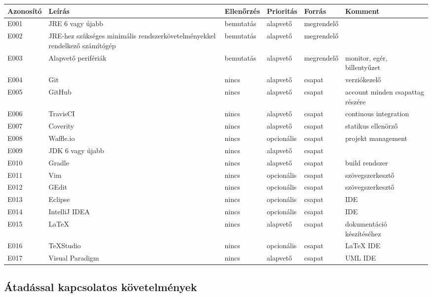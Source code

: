 \begin{tabularx}{\linewidth}{| l | X | l | l | l | X |}
\hline
\textbf{Azonosító}   & \textbf{Leírás} & \textbf{Ellenőrzés} & \textbf{Prioritás} & \textbf{Forrás} & \textbf{Komment} \tabularnewline
\hline\hline
\endhead
E001 & JRE 6 vagy újabb & bemutatás & alapvető & megrendelő &  \tabularnewline \hline
E002 & JRE-hez szükséges minimális rendszerkövetelményekkel rendelkező számítógép & bemutatás & alapvető & megrendelő & \tabularnewline \hline
E003 & Alapvető perifériák & bemutatás & alapvető & megrendelő & monitor, egér, billentyűzet \tabularnewline \hline
E004 & Git & nincs & alapvető & csapat & verziókezelő \tabularnewline \hline
E005 & GitHub & nincs & alapvető & csapat & account minden csapattag részére  \tabularnewline \hline
E006 & TravisCI & nincs & alapvető & csapat & continous integration \tabularnewline \hline
E007 & Coverity & nincs & alapvető & csapat & statikus ellenörző \tabularnewline \hline
E008 & Waffle.io & nincs & opcionális & csapat & projekt management \tabularnewline \hline
E009 & JDK 6 vagy újabb & nincs & alapvető & csapat & \tabularnewline \hline
E010 & Gradle & nincs & alapvető & csapat & build rendszer  \tabularnewline \hline
E011 & Vim & nincs & opcionális & csapat & szövegszerkesztő \tabularnewline \hline 
E012 & GEdit & nincs & opcionális & csapat & szövegszerkesztő \tabularnewline \hline
E013 & Eclipse & nincs & opcionális & csapat & IDE \tabularnewline \hline
E014 & IntelliJ IDEA & nincs & opcionális & csapat & IDE \tabularnewline \hline
E015 & LaTeX & nincs & alapvető & csapat & dokumentáció készítéséhez \tabularnewline \hline
E016 & TeXStudio & nincs & opcionális & csapat & LaTeX IDE \tabularnewline \hline
E017 & Visual Paradigm & nincs & alapvető & csapat & UML IDE \tabularnewline
\hline
\end{tabularx}

\subsection{Átadással kapcsolatos követelmények}

